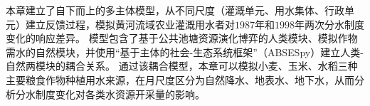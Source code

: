 
本章建立了自下而上的多主体模型，从不同尺度（灌溉单元、用水集体、行政单元）建立反馈过程，模拟黄河流域农业灌溉用水者对$1987$年和$1998$年两次分水制度变化的响应差异。
模型包含了基于公共池塘资源演化博弈的人类模块、模拟作物需水的自然模块，并使用“基于主体的社会-生态系统框架”（ABSESpy）建立人类-自然两模块的耦合关系。
通过该耦合模型，本章可以模拟小麦、玉米、水稻三种主要粮食作物种植用水来源，在月尺度区分为自然降水、地表水、地下水，从而分析分水制度变化对各类水资源开采量的影响。

